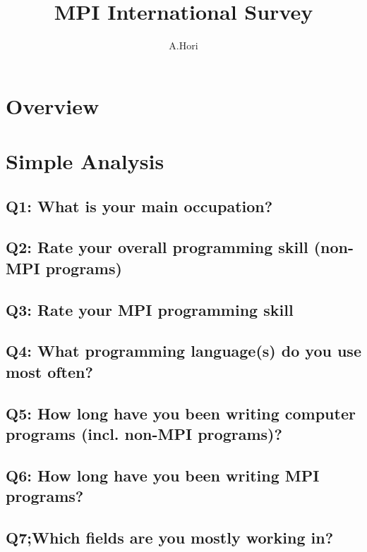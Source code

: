 \documentclass{report}
\title{MPI International Survey}
\author{A.Hori}
\begin{document}
\maketitle

\chapter{Overview}


\chapter{Simple Analysis}
\section{Q1: What is your main occupation?}


\clearpage
\section{Q2: Rate your overall programming skill (non-MPI programs)}


\clearpage
\section{Q3: Rate your MPI programming skill}


\clearpage
\section{Q4: What programming language(s) do you use most often?}


\clearpage
\section{Q5: How long have you been writing computer programs (incl. non-MPI programs)?}


\clearpage
\section{Q6: How long have you been writing MPI programs?}


\clearpage
\section{Q7;Which fields are you mostly working in?}

\end{document}
